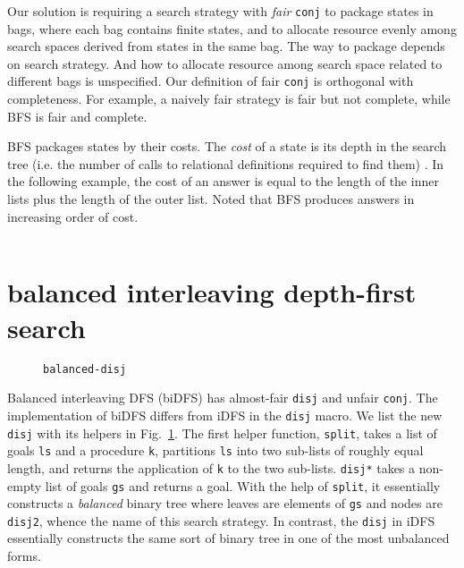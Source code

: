 \documentclass[format=acmlarge, review=true, authordraft=true]{acmart}
\newcommand{\conj}{\texttt{conj}}
\newcommand{\disj}{\texttt{disj}}
\begin{document}
Our solution is requiring a search strategy with \emph{fair} \conj{} to 
package states in bags, where each bag contains finite states, and to allocate 
resource evenly among search spaces derived from states in the same bag. The 
way to package depends on search strategy. And how to allocate resource among 
search space related to different bags is unspecified. Our definition of fair 
\conj{} is orthogonal with completeness. For example, a naively fair strategy 
is fair but not complete, while BFS is fair and complete. 

BFS packages states by their costs. The \emph{cost} of a state is its 
depth in the search tree (i.e. the number of calls to relational definitions 
required to find them) \citep{seres1999algebra}. In the following example, the 
cost of an answer is equal to the length of the inner lists plus the length of 
the outer list. Noted that BFS produces answers in increasing order of cost.

\begin{center}
	\begin{tabular}{c}
		
	\end{tabular}
\end{center}

\section{balanced interleaving depth-first search}

\begin{figure}
	
	\caption{\texttt{balanced-disj}}
	\label{balanced-disj}
\end{figure}

Balanced interleaving DFS (biDFS) has almost-fair \disj{} and unfair \conj{}. 
The implementation of biDFS differs from iDFS in the \disj{} macro. We list the 
new \disj{} with its helpers in Fig.~\ref{balanced-disj}. The first helper 
function, \texttt{split}, takes a list of goals \texttt{ls} and a procedure 
\texttt{k}, partitions \texttt{ls} into two sub-lists of roughly equal length, 
and returns the application of \texttt{k} to the two sub-lists. \texttt{disj*} 
takes a non-empty list of goals \texttt{gs} and returns a goal. With the help 
of \texttt{split}, it essentially constructs a \emph{balanced} binary tree 
where leaves are elements of \texttt{gs} and nodes are \texttt{disj2}, whence 
the name of this search strategy. In contrast, the \disj{} in iDFS essentially 
constructs the same sort of binary tree in one of the most unbalanced forms.
\end{document}
